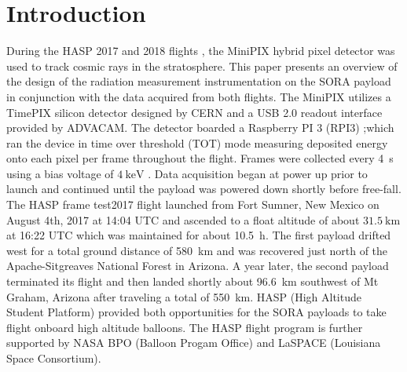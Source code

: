 \section{Introduction}
\label{Introduction}

During the HASP 2017 and 2018 flights \cite{hasp} , the MiniPIX hybrid pixel detector\cite{minipix} was used to track cosmic rays in the stratosphere. 
%
This paper presents an overview of the design of the radiation measurement  instrumentation on the SORA payload in conjunction with the data acquired  from both flights.
%
The MiniPIX utilizes a TimePIX\cite{timepix} silicon detector designed by CERN\cite{cern} and a USB 2.0 readout interface provided by ADVACAM\cite{advacam}. 
%
The detector boarded a Raspberry PI 3 (RPI3) ;which ran the device in time over threshold (TOT) mode measuring deposited energy onto each pixel per frame throughout the flight. 
%
Frames were collected every \SI{4}{\second} using a bias voltage of $\SI{4}{\kilo\electronvolt}$ . 
%
Data acquisition began at power up prior to launch and continued until the payload was powered down shortly before free-fall. 
%
The HASP frame test2017 flight launched from Fort Sumner, New Mexico on August 4th, 2017 at 14:04 UTC and ascended to a float altitude of about $\SI{31.5}{\kilo\meter}$ at 16:22 UTC which was maintained for about \SI{10.5}{\hour}.
%
 The first payload drifted west for a total ground distance of \SI{580}{\kilo\meter} and was recovered just north of the Apache-Sitgreaves National Forest in Arizona. 
 A year later, the second payload terminated its flight and then landed shortly about \SI{96.6}{\kilo\meter} southwest of Mt Graham, Arizona after traveling a total of \SI{550}{\kilo\meter}.
 HASP (High Altitude Student Platform) provided both opportunities for the SORA payloads to take flight onboard high altitude balloons. The HASP flight program is further supported by NASA BPO (Balloon Progam Office) and LaSPACE (Louisiana Space Consortium).
